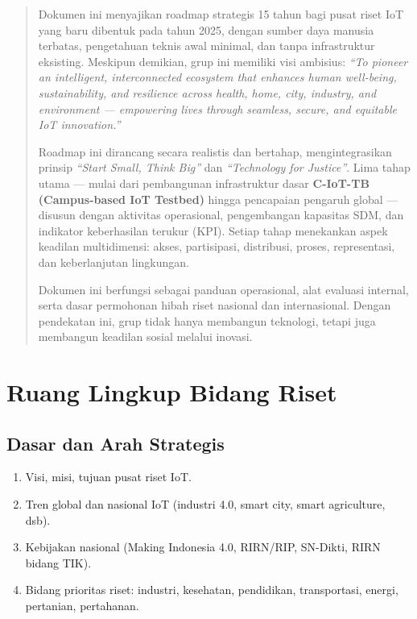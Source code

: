 \documentclass[11pt,a4paper]{article}
\begin{document}
\begin{abstract}
    Dokumen ini menyajikan roadmap strategis 15 tahun bagi pusat riset IoT yang baru dibentuk pada tahun 2025, dengan sumber daya manusia terbatas, pengetahuan teknis awal minimal, dan tanpa infrastruktur eksisting. Meskipun demikian, grup ini memiliki visi ambisius: \textit{“To pioneer an intelligent, interconnected ecosystem that enhances human well-being, sustainability, and resilience across health, home, city, industry, and environment — empowering lives through seamless, secure, and equitable IoT innovation.”}

    Roadmap ini dirancang secara realistis dan bertahap, mengintegrasikan prinsip \textit{“Start Small, Think Big”} dan \textit{“Technology for Justice”}. Lima tahap utama — mulai dari pembangunan infrastruktur dasar \textbf{C-IoT-TB (Campus-based IoT Testbed)} hingga pencapaian pengaruh global — disusun dengan aktivitas operasional, pengembangan kapasitas SDM, dan indikator keberhasilan terukur (KPI). Setiap tahap menekankan aspek keadilan multidimensi: akses, partisipasi, distribusi, proses, representasi, dan keberlanjutan lingkungan.

    Dokumen ini berfungsi sebagai panduan operasional, alat evaluasi internal, serta dasar permohonan hibah riset nasional dan internasional. Dengan pendekatan ini, grup tidak hanya membangun teknologi, tetapi juga membangun keadilan sosial melalui inovasi.
\end{abstract}

\tableofcontents
\newpage

\section{Ruang Lingkup Bidang Riset}
\subsection{Dasar dan Arah Strategis}
\begin{enumerate}
    \item Visi, misi, tujuan pusat riset IoT.
    \item Tren global dan nasional IoT (industri 4.0, smart city, smart agriculture, dsb).
    \item Kebijakan nasional (Making Indonesia 4.0, RIRN/RIP, SN-Dikti, RIRN bidang TIK).
    \item Bidang prioritas riset: industri, kesehatan, pendidikan, transportasi, energi, pertanian, pertahanan.
\end{enumerate}
\end{document}
